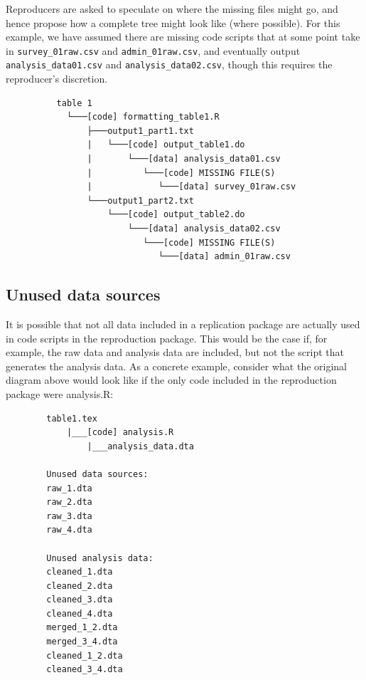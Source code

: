 \documentclass[
]{book}
\begin{document}
Reproducers are asked to speculate on where the missing files might go, and hence propose how a complete tree might look like (where possible). For this example, we have assumed there are missing code scripts that at some point take in \texttt{survey\_01raw.csv} and \texttt{admin\_01raw.csv}, and eventually output \texttt{analysis\_data01.csv} and \texttt{analysis\_data02.csv}, though this requires the reproducer's discretion.

\begin{verbatim}
          table 1
            └───[code] formatting_table1.R
                ├───output1_part1.txt  
                |   └───[code] output_table1.do           
                |       └───[data] analysis_data01.csv
                |          └───[code] MISSING FILE(S)
                |             └───[data] survey_01raw.csv
                └───output1_part2.txt  
                    └───[code] output_table2.do           
                        └───[data] analysis_data02.csv
                           └───[code] MISSING FILE(S)
                              └───[data] admin_01raw.csv  
\end{verbatim}

\hypertarget{unused-data-sources}{%
\subsection{Unused data sources}\label{unused-data-sources}}

It is possible that not all data included in a replication package are actually used in code scripts in the reproduction package. This would be the case if, for example, the raw data and analysis data are included, but not the script that generates the analysis data. As a concrete example, consider what the original diagram above would look like if the only code included in the reproduction package were analysis.R:

\begin{verbatim}
        table1.tex
            |___[code] analysis.R
                |___analysis_data.dta

        Unused data sources:
        raw_1.dta
        raw_2.dta
        raw_3.dta
        raw_4.dta

        Unused analysis data:
        cleaned_1.dta
        cleaned_2.dta
        cleaned_3.dta
        cleaned_4.dta
        merged_1_2.dta
        merged_3_4.dta
        cleaned_1_2.dta
        cleaned_3_4.dta
\end{verbatim}
\end{document}
